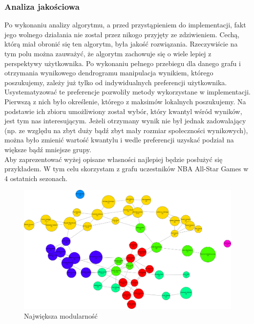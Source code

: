 \documentclass{article}
\begin{document}
\subsubsection{Analiza jakościowa}
Po wykonaniu analizy algorytmu, a przed przystąpieniem do implementacji, fakt jego wolnego działania nie został przez nikogo przyjęty ze zdziwieniem. Cechą, którą miał obronić się ten algorytm, była jakość rozwiązania. Rzeczywiście na tym polu można zauważyć, że algorytm zachowuje się o wiele lepiej z perspektywy użytkownika. Po wykonaniu pełnego przebiegu dla danego grafu i otrzymania wynikowego dendrogramu manipulacja wynikiem, którego poszukujemy, zależy już tylko od indywidualnych preferencji użytkownika.\\

Usystematyzować te preferencje pozwoliły metody wykorzystane w implementacji. Pierwszą z nich było określenie, którego z maksimów lokalnych poszukujemy. Na podstawie ich zbioru umożliwiony został wybór, który kwantyl wśród wyników, jest tym nas interesującym. Jeżeli otrzymany wynik nie był jednak zadowalający (np. ze względu na zbyt duży bądź zbyt mały rozmiar społeczności wynikowych), można było zmienić wartość kwantylu i wedle preferencji uzyskać podział na większe bądź mniejsze grupy.\\

Aby zaprezentować wyżej opisane własności najlepiej będzie posłużyć się przykładem. W tym celu skorzystam z grafu uczestników NBA All-Star Games w 4 ostatnich sezonach.

\begin{figure}[H]
\centering
\includegraphics[width=\textwidth]{images/is-sample-1.png}
\caption{Największa modularność}
\end{figure}
\end{document}
